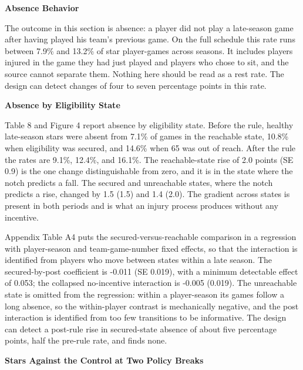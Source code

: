 \documentclass[12pt]{article}
\newcommand{\lone}[1]{\par\medskip\noindent\begin{center}\textbf{#1}\end{center}\par\nopagebreak}
\newcommand{\ltwo}[1]{\par\medskip\noindent\textbf{#1}\par\nopagebreak}
\begin{document}
\lone{Absence Behavior}


The outcome in this section is absence: a player did not play a late-season game after having played his team's previous game. On the full schedule this rate runs between 7.9\% and 13.2\% of star player-games across seasons. It includes players injured in the game they had just played and players who chose to sit, and the source cannot separate them. Nothing here should be read as a rest rate. The design can detect changes of four to seven percentage points in this rate.


\ltwo{Absence by Eligibility State}


Table 8 and Figure 4 report absence by eligibility state. Before the rule, healthy late-season stars were absent from 7.1\% of games in the reachable state, 10.8\% when eligibility was secured, and 14.6\% when 65 was out of reach. After the rule the rates are 9.1\%, 12.4\%, and 16.1\%. The reachable-state rise of 2.0 points (SE 0.9) is the one change distinguishable from zero, and it is in the state where the notch predicts a fall. The secured and unreachable states, where the notch predicts a rise, changed by 1.5 (1.5) and 1.4 (2.0). The gradient across states is present in both periods and is what an injury process produces without any incentive.

Appendix Table A4 puts the secured-versus-reachable comparison in a regression with player-season and team-game-number fixed effects, so that the interaction is identified from players who move between states within a late season. The secured-by-post coefficient is -0.011 (SE 0.019), with a minimum detectable effect of 0.053; the collapsed no-incentive interaction is -0.005 (0.019). The unreachable state is omitted from the regression: within a player-season its games follow a long absence, so the within-player contrast is mechanically negative, and the post interaction is identified from too few transitions to be informative. The design can detect a post-rule rise in secured-state absence of about five percentage points, half the pre-rule rate, and finds none.


\ltwo{Stars Against the Control at Two Policy Breaks}
\end{document}
